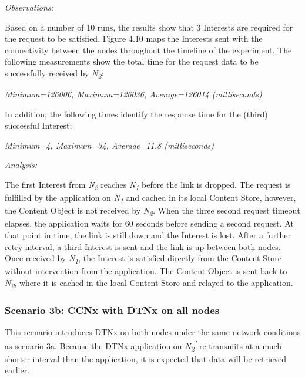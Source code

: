 \documentclass[a4paper,12pt]{report}      %
\begin{document}
\vspace*{1\baselineskip}\noindent\emph{Observations:}

Based on a number of 10 runs, the results show that 3 Interests are required for the request to be
satisfied. Figure 4.10 maps the Interests sent with the connectivity between the nodes throughout the timeline of the experiment. 
The following measurements show the total time for the request data to be successfully received by \emph{N\textsubscript{2}}:

\begin{center}\textsl{Minimum=126006, Maximum=126036, Average=126014 (milliseconds)}\end{center}

In addition, the following times identify the response time for the (third) successful Interest:

\begin{center}\textsl{Minimum=4, Maximum=34, Average=11.8 (milliseconds)}\end{center}

\vspace*{1\baselineskip}\noindent\emph{Analysis:}

The first Interest from \emph{N\textsubscript{2}} reaches \emph{N\textsubscript{1}} before the link is dropped. The request is fulfilled by the application on \emph{N\textsubscript{1}} and cached in its local Content Store, however, the Content Object is not received by \emph{N\textsubscript{2}}. When the three second request timeout elapses, the application waits for 60 seconds before sending a second request. At that point in time, the link is still down and the Interest is lost. After a further retry interval, a third Interest is sent and the link is up between both nodes. Once received by \emph{N\textsubscript{1}}, the Interest is satisfied directly from the Content Store without intervention from the application. The Content Object is sent back to \emph{N\textsubscript{2}}, where it is cached in the local Content Store and relayed to the application.

\subsubsection{Scenario 3b: CCNx with DTNx on all nodes}

This scenario introduces DTNx on both nodes under the same network conditions as scenario 3a. Because the DTNx application on \emph{N\textsubscript{2}\textsuperscript{'}} re-transmits at a much shorter interval than the application, it is expected that data will be retrieved earlier.
\end{document}
